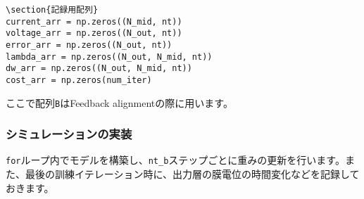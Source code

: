 \begin{verbatim}
\section{記録用配列}
current_arr = np.zeros((N_mid, nt))
voltage_arr = np.zeros((N_out, nt))
error_arr = np.zeros((N_out, nt))
lambda_arr = np.zeros((N_out, N_mid, nt))
dw_arr = np.zeros((N_out, N_mid, nt))
cost_arr = np.zeros(num_iter)
\end{verbatim}
ここで配列\texttt{B}はFeedback alignmentの際に用います。
\subsubsection{シミュレーションの実装}
\texttt{for}ループ内でモデルを構築し、\texttt{nt\_b}ステップごとに重みの更新を行います。また、最後の訓練イテレーション時に、出力層の膜電位の時間変化などを記録しておきます。
